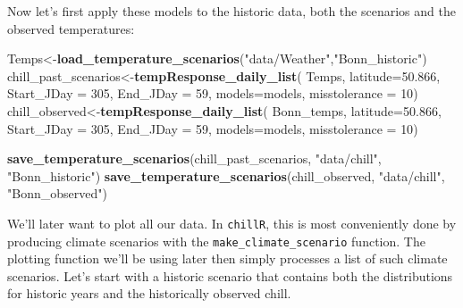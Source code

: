 \documentclass[
]{book}
\newenvironment{Shaded}{\begin{snugshade}}{\end{snugshade}}
\newcommand{\DataTypeTok}[1]{\textcolor[rgb]{0.13,0.29,0.53}{#1}}
\newcommand{\DecValTok}[1]{\textcolor[rgb]{0.00,0.00,0.81}{#1}}
\newcommand{\FloatTok}[1]{\textcolor[rgb]{0.00,0.00,0.81}{#1}}
\newcommand{\KeywordTok}[1]{\textcolor[rgb]{0.13,0.29,0.53}{\textbf{#1}}}
\newcommand{\NormalTok}[1]{#1}
\newcommand{\StringTok}[1]{\textcolor[rgb]{0.31,0.60,0.02}{#1}}
\begin{document}
Now let's first apply these models to the historic data, both the scenarios and the observed temperatures:

\begin{Shaded}
\begin{Highlighting}[]
\NormalTok{Temps<-}\KeywordTok{load_temperature_scenarios}\NormalTok{(}\StringTok{"data/Weather"}\NormalTok{,}\StringTok{"Bonn_historic"}\NormalTok{)}
\NormalTok{chill_past_scenarios<-}\KeywordTok{tempResponse_daily_list}\NormalTok{(}
\NormalTok{  Temps,}
  \DataTypeTok{latitude=}\FloatTok{50.866}\NormalTok{,}
  \DataTypeTok{Start_JDay =} \DecValTok{305}\NormalTok{,}
  \DataTypeTok{End_JDay =} \DecValTok{59}\NormalTok{,}
  \DataTypeTok{models=}\NormalTok{models,}
  \DataTypeTok{misstolerance =} \DecValTok{10}\NormalTok{)}
\NormalTok{chill_observed<-}\KeywordTok{tempResponse_daily_list}\NormalTok{(}
\NormalTok{  Bonn_temps,}
  \DataTypeTok{latitude=}\FloatTok{50.866}\NormalTok{,}
  \DataTypeTok{Start_JDay =} \DecValTok{305}\NormalTok{,}
  \DataTypeTok{End_JDay =} \DecValTok{59}\NormalTok{,}
  \DataTypeTok{models=}\NormalTok{models,}
  \DataTypeTok{misstolerance =} \DecValTok{10}\NormalTok{)}

\KeywordTok{save_temperature_scenarios}\NormalTok{(chill_past_scenarios,}
                           \StringTok{"data/chill"}\NormalTok{,}
                           \StringTok{"Bonn_historic"}\NormalTok{)}
\KeywordTok{save_temperature_scenarios}\NormalTok{(chill_observed,}
                           \StringTok{"data/chill"}\NormalTok{,}
                           \StringTok{"Bonn_observed"}\NormalTok{)}
\end{Highlighting}
\end{Shaded}

We'll later want to plot all our data. In \texttt{chillR}, this is most conveniently done by producing climate scenarios with the \texttt{make\_climate\_scenario} function. The plotting function we'll be using later then simply processes a list of such climate scenarios. Let's start with a historic scenario that contains both the distributions for historic years and the historically observed chill.
\end{document}
